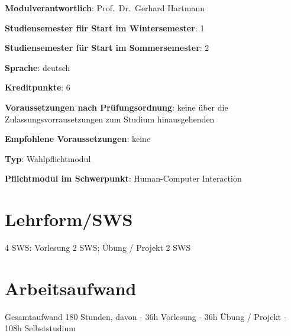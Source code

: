 \begin{modulHead}
\textbf{Modulverantwortlich}: Prof.~Dr.~Gerhard
Hartmann
\end{modulHead}
\begin{modulHead}
\textbf{Studiensemester für
Start im Wintersemester}:
1
\end{modulHead}
\begin{modulHead}
\textbf{Studiensemester für Start
im Sommersemester}:
2
\end{modulHead}
\begin{modulHead}
\textbf{Sprache}:
deutsch
\end{modulHead}
\begin{modulHead}
\textbf{Kreditpunkte}:
6
\end{modulHead}
\begin{modulHead}
\textbf{Voraussetzungen nach
Prüfungsordnung}: keine über die Zulassungsvorrausetzungen zum Studium
hinausgehenden
\end{modulHead}
\begin{modulHead}
\textbf{Empfohlene
Voraussetzungen}: keine
\end{modulHead}
\begin{modulHead}
\textbf{Typ}:
Wahlpflichtmodul
\end{modulHead}
\begin{modulHead}
\textbf{Pflichtmodul
im Schwerpunkt}: Human-Computer Interaction
\end{modulHead}


\section*{Lehrform/SWS\label{/mi-2017/modulbeschreibungen-master/MA_HCI_Sketching_and_Designing_for_User_Experience}}\label{lehrformswspathlabelmi-2017modulbeschreibungen-mastermaux5fhciux5fsketchingux5fandux5fdesigningux5fforux5fuserux5fexperience}

4 SWS: Vorlesung 2 SWS; Übung / Projekt 2 SWS

\section*{Arbeitsaufwand\label{/mi-2017/modulbeschreibungen-master/MA_HCI_Sketching_and_Designing_for_User_Experience}}\label{arbeitsaufwandpathlabelmi-2017modulbeschreibungen-mastermaux5fhciux5fsketchingux5fandux5fdesigningux5fforux5fuserux5fexperience}

Gesamtaufwand 180 Stunden, davon - 36h Vorlesung - 36h Übung / Projekt -
108h Selbststudium


